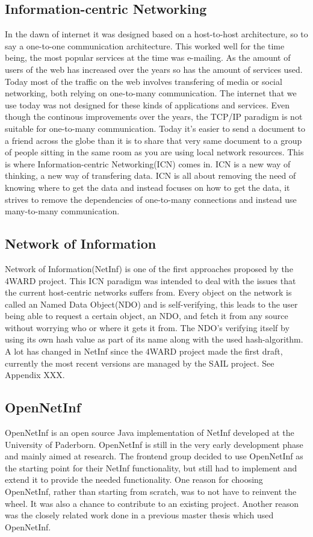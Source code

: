 \subsection{Information-centric Networking}
In the dawn of internet it was designed based on a host-to-host architecture, so to say a one-to-one communication architecture. This worked well for the time being, the most popular services at the time was e-mailing. As the amount of users of the web has increased over the years so has the amount of services used. Today most of the traffic on the web involves transfering of media or social networking, both relying on one-to-many communication. The internet that we use today was not designed for these kinds of applications and services. 
Even though the continous improvements over the years, the TCP/IP paradigm is not suitable for one-to-many communication. 
Today it's easier to send a document to a friend across the globe than it is to share that very same document to a group of people sitting in the same room as you are using local network resources\cite{ICNarticle}.
This is where Information-centric Networking(ICN) comes in. ICN is a new way of thinking, a new way of transfering data. ICN is all about removing the need of knowing where to get the data and instead focuses on how to get the data\cite{ICNarticle}, it strives to remove the dependencies of one-to-many connections and instead use many-to-many communication.

\subsection{Network of Information}
Network of Information(NetInf) is one of the first approaches proposed by the 4WARD project. \cite{4ward} This ICN paradigm was intended to deal with the issues that the current host-centric networks suffers from. Every object on the network is called an Named Data Object(NDO) and is self-verifying, this leads to the user being able to request a certain object, an NDO, and fetch it from any source without worrying who or where it gets it from. The NDO's verifying itself by using its own hash value as part of its name along with the used hash-algorithm.
A lot has changed in NetInf since the 4WARD project made the first draft, currently the most recent versions are managed by the SAIL project. See Appendix XXX.

\subsection{OpenNetInf}
OpenNetInf \cite{opennetinf} is an open source Java implementation of NetInf  developed at the University of Paderborn. OpenNetInf is still in the very early development phase and mainly aimed at research. The frontend group decided to use OpenNetInf as the starting point for their NetInf functionality, but still had to implement and extend it to provide the needed functionality. One reason for choosing OpenNetInf, rather than starting from scratch, was to not have to reinvent the wheel. It was also a chance to contribute to an existing project. Another reason was the closely related work done in a previous master thesis \cite{masterthesis} which used OpenNetInf.
